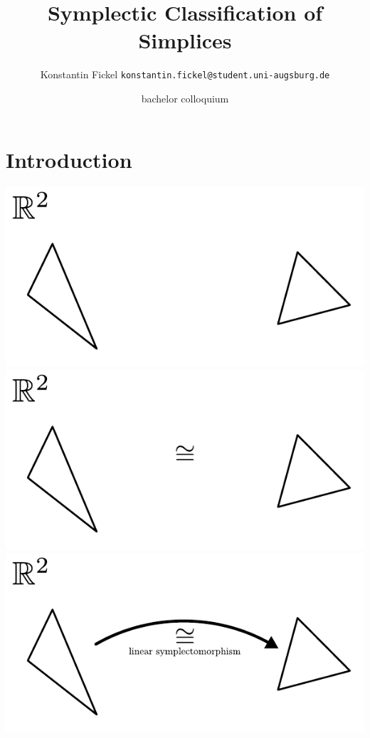 \documentclass[compress]{beamer}
\title{Symplectic Classification of Simplices}
\date[9. 9. 2019]{bachelor colloquium}
\author[Konstantin Fickel]{Konstantin Fickel \texttt{konstantin.fickel@student.uni-augsburg.de}}
\begin{document}
 

\section{Introduction}

\blankframe{}

\begin{frame} 
  \begin{center}
    \begin{overprint}
      \includegraphics[scale=1.0]{../img/introduction/01.pdf}
      \includegraphics[scale=1.0]{../img/introduction/02.pdf}
      \includegraphics[scale=1.0]{../img/introduction/03.pdf}

\end{overprint}
\end{center}
\end{frame}
\end{document}
